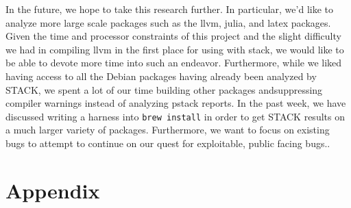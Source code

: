 \documentclass[11pt,twocolumn]{article}
\begin{document}
In the future, we hope to take this research further. In particular, we'd like to analyze more large
scale packages such as the llvm, julia, and latex packages. Given the time and processor constraints
of this project and the slight difficulty we had in compiling llvm in the first place for using
with stack, we would like to be able to devote more time into such an endeavor. Furthermore, while we liked
having access to all the Debian packages having already been analyzed by STACK, we spent a lot of our time
building other packages andsuppressing compiler warnings instead of analyzing pstack reports. 
In the past week, we have discussed writing a harness into \texttt{brew install} in order to get STACK
results on a much larger variety of packages. Furthermore, we want to focus on existing bugs to attempt
to continue on our quest for exploitable, public facing bugs..



\section{Appendix}
\label{sec:appendix}
\end{document}
